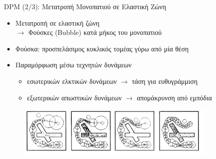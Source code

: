 \documentclass[10pt, compress]{beamer}
\begin{document}
\begin{frame}{DPM (2/3): Μετατροπή Μονοπατιού σε Ελαστική Ζώνη}
	\begin{itemize}
		\item Μετατροπή σε ελαστική ζώνη\\
		$\rightarrow$ Φούσκες (Bubble) κατά μήκος του μονοπατιού
		\item Φούσκα: προσπελάσιμος κυκλικός τομέας γύρω από μία θέση\\
		\item Παραμόρφωση μέσω τεχνητών δυνάμεων
		\begin{itemize}
			\item εσωτερικών ελκτικών δυνάμεων $\rightarrow$ τάση για ευθυγράμμιση
			\item εξωτερικών απωστικών δυνάμεων $\rightarrow$ απομάκρυνση από εμπόδια
		\end{itemize}
	\end{itemize}
	
	\begin{figure}
		\includegraphics[height=2.5cm]{Figures/eband.png}
	\end{figure}
\end{frame}
\end{document}

